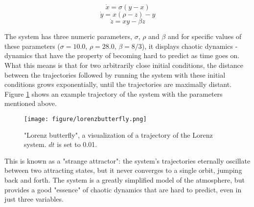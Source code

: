 \begin{equation}
\dot{x} = \sigma (y - x)
\label{eq:xlor}
\end{equation}
\begin{equation}
\dot{y} = x(\rho - z) - y
\label{eq:ylor}
\end{equation}
\begin{equation}
\dot{z} = xy - \beta z
\label{eq:zlor}
\end{equation}

The system has three numeric parameters, $\sigma$, $\rho$ and $\beta$ and for specific values of these parameters ($\sigma = 10.0$, $\rho = 28.0$, $\beta = 8/3$), it displays chaotic dynamics - dynamics that have the property of becoming hard to predict as time goes on. What this means is that for two arbitrarily close initial conditions, the distance between the trajectories followed by running the system with these initial conditions grows exponentially, until the trajectories are maximally distant. Figure \ref{fig:lorenzbutterfly} shows an example trajectory of the system with the parameters mentioned above.

\begin{figure}
    \centering
    \texttt{[image: figure/lorenzbutterfly.png]}
    \caption{"Lorenz butterfly", a visualization of a trajectory of the Lorenz system. $dt$ is set to 0.01.}
    \label{fig:lorenzbutterfly}
\end{figure}

This is known as a "strange attractor": the system's trajectories eternally oscillate between two attracting states, but it never converges to a single orbit, jumping back and forth. The system is a greatly simplified model of the atmosphere, but provides a good "essence" of chaotic dynamics that are hard to predict, even in just three variables. 

